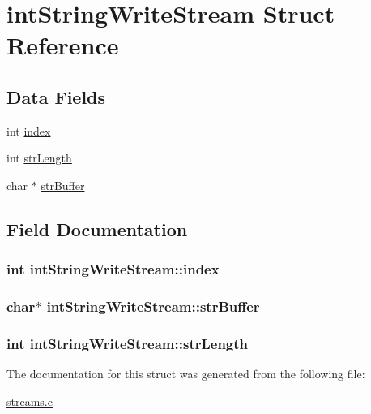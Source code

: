 \hypertarget{structintStringWriteStream}{\section{int\+String\+Write\+Stream Struct Reference}
\label{structintStringWriteStream}
}
\subsection*{Data Fields}
\begin{DoxyCompactItemize}
\item 
int \hyperlink{structintStringWriteStream_a229cee44722e2943e0d74f195037d9bb}{index}
\item 
int \hyperlink{structintStringWriteStream_aae80c01e328f7523b09fa786d1b826da}{str\+Length}
\item 
char $\ast$ \hyperlink{structintStringWriteStream_a864290316dbc2cfd6aa50ce8d827def2}{str\+Buffer}
\end{DoxyCompactItemize}


\subsection{Field Documentation}
\hypertarget{structintStringWriteStream_a229cee44722e2943e0d74f195037d9bb}{
\subsubsection[{index}]{\setlength{\rightskip}{0pt plus 5cm}int int\+String\+Write\+Stream\+::index}}\label{structintStringWriteStream_a229cee44722e2943e0d74f195037d9bb}
\hypertarget{structintStringWriteStream_a864290316dbc2cfd6aa50ce8d827def2}{
\subsubsection[{str\+Buffer}]{\setlength{\rightskip}{0pt plus 5cm}char$\ast$ int\+String\+Write\+Stream\+::str\+Buffer}}\label{structintStringWriteStream_a864290316dbc2cfd6aa50ce8d827def2}
\hypertarget{structintStringWriteStream_aae80c01e328f7523b09fa786d1b826da}{
\subsubsection[{str\+Length}]{\setlength{\rightskip}{0pt plus 5cm}int int\+String\+Write\+Stream\+::str\+Length}}\label{structintStringWriteStream_aae80c01e328f7523b09fa786d1b826da}


The documentation for this struct was generated from the following file\+:\begin{DoxyCompactItemize}
\item 
\hyperlink{streams_8c}{streams.\+c}\end{DoxyCompactItemize}
